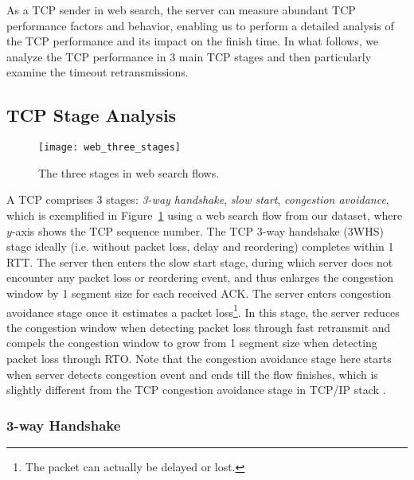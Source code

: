 As a TCP sender in web search, the server can measure abundant TCP performance factors and behavior, enabling us to perform a detailed analysis of the TCP performance and its impact on the finish time. In what follows, we analyze the TCP performance in 3 main TCP stages and then particularly examine the timeout retransmissions.


\subsection{TCP Stage Analysis}

\begin{figure}[th]
\centering
\texttt{[image: web\_three\_stages]}
\caption{The three stages in web search flows.}
\label{fig:web_three_stages}
\end{figure}

A TCP comprises 3 stages: \emph{3-way handshake}, \emph{slow start}, \emph{congestion avoidance}, which is exemplified in Figure~\ref{fig:web_three_stages} using a web search flow from our dataset, where $y$-axis shows the TCP sequence number. The TCP 3-way handshake (3WHS) stage ideally (i.e. without packet loss, delay and reordering) completes within 1 RTT. The server then enters the slow start stage, during which server does not encounter any packet loss or reordering event, and thus enlarges the congestion window by 1 segment size for each received ACK. The server enters congestion avoidance stage once it estimates a packet loss\footnote{The packet can actually be delayed or lost.}. In this stage, the server reduces the congestion window when detecting packet loss through fast retransmit\cite{rfc6675} and compels the congestion window to grow from 1 segment size when detecting packet loss through RTO. Note that the congestion avoidance stage here starts when server detects congestion event and ends till the flow finishes, which is slightly different from the TCP congestion avoidance stage in TCP/IP stack \cite{jacobson1988congestion}.


\subsubsection{3-way Handshake}

